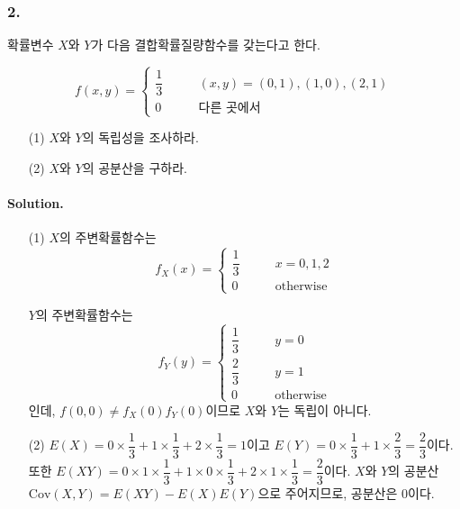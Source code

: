 \subsubsection{2.} 확률변수 $X$와 $Y$가 다음 결합확률질량함수를 갖는다고 한다.

\[f\left(x, y\right) = \left\{
\begin{array}{ll}
	\dfrac{1}{3} & \qquad \left(x, y\right) = \left(0, 1\right), \left(1, 0\right), \left(2, 1\right) \\
	0 & \qquad\textrm{다른 곳에서}
\end{array}
\right. \]

\begin{itemize}
  \item [(1)] $X$와 $Y$의 독립성을 조사하라.
  \item [(2)] $X$와 $Y$의 공분산을 구하라.
\end{itemize}

\paragraph{Solution.} \begin{itemize}
  \item [(1)] $X$의 주변확률함수는
\[f_X\left(x\right) = \left\{
\begin{array}{ll}
	\dfrac{1}{3} & \qquad x = 0, 1, 2 \\
	0 & \qquad\textrm{otherwise}
\end{array}
\right. \]

 $Y$의 주변확률함수는
 \[f_Y\left(y\right) = \left\{
\begin{array}{ll}
	\dfrac{1}{3} & \qquad y = 0 \\
	\dfrac{2}{3} & \qquad y = 1 \\
	0 & \qquad\textrm{otherwise}
\end{array}
\right. \]인데, $f\left(0, 0\right) \neq f_X\left(0\right)f_Y\left(0\right)$이므로 $X$와 $Y$는 독립이 아니다.\\
  \item [(2)] $E\left(X\right)=0\times \dfrac{1}{3}+1\times \dfrac{1}{3}+2\times \dfrac{1}{3} = 1$이고 $E\left(Y\right)=0\times \dfrac{1}{3}+1\times \dfrac{2}{3}=\dfrac{2}{3}$이다. 또한 $E\left(XY\right)=0\times 1\times \dfrac{1}{3}+1\times 0\times \dfrac{1}{3}+2\times 1\times \dfrac{1}{3}=\dfrac{2}{3}$이다. $X$와 $Y$의 공분산 $\mathrm{Cov}\left(X, Y\right)=E\left(XY\right)-E\left(X\right)E\left(Y\right)$으로 주어지므로, 공분산은 $0$이다.
\end{itemize}

